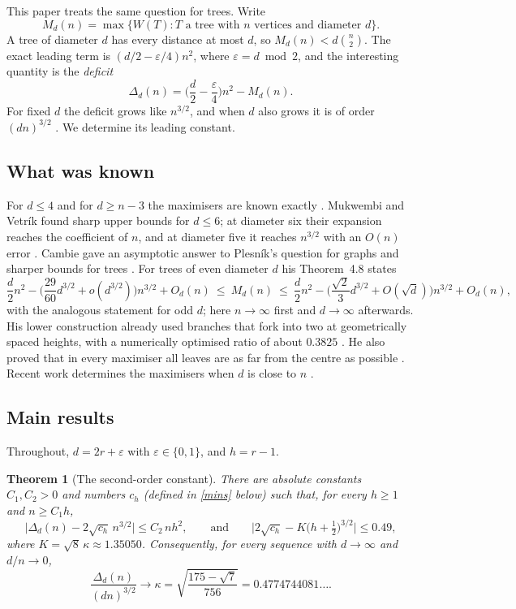 \documentclass[11pt,a4paper]{article}
\newtheorem{theorem}{Theorem}[section]
\theoremstyle{remark}
\newcommand{\eps}{\varepsilon}
\begin{document}
This paper treats the same question for trees. Write
\[
 M_d(n)=\max\{W(T): T \text{ a tree with } n \text{ vertices and diameter } d\}.
\]
A tree of diameter $d$ has every distance at most $d$, so $M_d(n)<d\binom n2$. The exact leading term is $(d/2-\eps/4)n^2$, where $\eps=d\bmod2$, and the interesting quantity is the \emph{deficit}
\[
 \Delta_d(n)=\Big(\frac d2-\frac\eps4\Big)n^2-M_d(n).
\]
For fixed $d$ the deficit grows like $n^{3/2}$, and when $d$ also grows it is of order $(dn)^{3/2}$ \cite{cambie}. We determine its leading constant.

\subsection{What was known}
For $d\le4$ and for $d\ge n-3$ the maximisers are known exactly \cite{wang,wagner}. Mukwembi and Vetrík found sharp upper bounds for $d\le6$; at diameter six their expansion reaches the coefficient of $n$, and at diameter five it reaches $n^{3/2}$ with an $O(n)$ error \cite[Thms~3.3--3.4]{mv}. Cambie gave an asymptotic answer to Plesník's question for graphs and sharper bounds for trees \cite{cambie}. For trees of even diameter $d$ his Theorem~4.8 states
\[
 \frac d2n^2-\Big(\frac{29}{60}d^{3/2}+o(d^{3/2})\Big)n^{3/2}+O_d(n)\ \le\ M_d(n)\ \le\ \frac d2n^2-\Big(\frac{\sqrt2}{3}d^{3/2}+O(\sqrt d)\Big)n^{3/2}+O_d(n),
\]
with the analogous statement for odd $d$; here $n\to\infty$ first and $d\to\infty$ afterwards. His lower construction already used branches that fork into two at geometrically spaced heights, with a numerically optimised ratio of about $0.3825$ \cite[proof of Thm~3.4]{cambie}. He also proved that in every maximiser all leaves are as far from the centre as possible \cite[Lemma~4.1]{cambie}. Recent work determines the maximisers when $d$ is close to $n$ \cite{doublebroom,pandey}.

\subsection{Main results}
Throughout, $d=2r+\eps$ with $\eps\in\{0,1\}$, and $h=r-1$.

\begin{theorem}[The second-order constant]\label{thm:joint}
There are absolute constants $C_1,C_2>0$ and numbers $c_h$ (defined in \eqref{mins} below) such that, for every $h\ge1$ and $n\ge C_1h$,
\[
 \big|\Delta_d(n)-2\sqrt{c_h}\,n^{3/2}\big|\le C_2\,nh^2,\qquad\text{and}\qquad
 \Big|2\sqrt{c_h}-K\big(h+\tfrac12\big)^{3/2}\Big|\le0.49,
\]
where $K=\sqrt8\,\kappa\approx1.35050$. Consequently, for every sequence with $d\to\infty$ and $d/n\to0$,
\[
 \frac{\Delta_d(n)}{(dn)^{3/2}}\longrightarrow\kappa=\sqrt{\frac{175-\sqrt7}{756}}=0.4774744081\ldots .
\]
\end{theorem}
\end{document}
